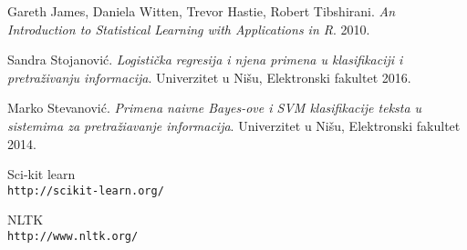 
\begin{thebibliography}{9}
Gareth James, Daniela Witten, Trevor Hastie, Robert Tibshirani.
\textit{An Introduction to Statistical Learning with Applications in R}. 2010.

Sandra Stojanović.
\textit{Logistička regresija i njena primena u klasifikaciji i pretraživanju informacija}.
Univerzitet u Nišu, Elektronski fakultet 2016.

Marko Stevanović.
\textit{Primena naivne Bayes-ove i SVM klasifikacije teksta u sistemima za pretražiavanje informacija}.
Univerzitet u Nišu, Elektronski fakultet 2014.

Sci-kit learn
\\\texttt{http://scikit-learn.org/}

NLTK
\\\texttt{http://www.nltk.org/}

\end{thebibliography}
